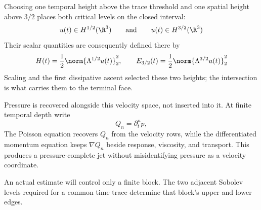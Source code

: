 Choosing one temporal height above the trace threshold and one spatial height
above \(3/2\) places both critical levels on the closed interval:
\[
  u(t)\in H^{1/2}(\R^3)
  \qquad\text{and}\qquad
  u(t)\in H^{3/2}(\R^3)
\]
Their scalar quantities are consequently defined there by
\[
  H(t)=\frac12\norm{\Lambda^{1/2}u(t)}_2^2,
  \qquad
  E_{3/2}(t)=\frac12\norm{\Lambda^{3/2}u(t)}_2^2
\]
Scaling and the first dissipative ascent selected these two heights; the
intersection is what carries them to the terminal face.

Pressure is recovered alongside this velocity space, not inserted into it.  At
finite temporal depth write
\[
  Q_n=\partial_t^np,
\]
The Poisson equation recovers \(Q_n\) from the velocity rows, while the
differentiated momentum equation keeps \(\nabla Q_n\) beside response,
viscosity, and transport.  This produces a pressure-complete jet without
misidentifying pressure as a velocity coordinate.

An actual estimate will control only a finite block.  The two adjacent Sobolev
levels required for a common time trace determine that block’s upper and lower
edges.
